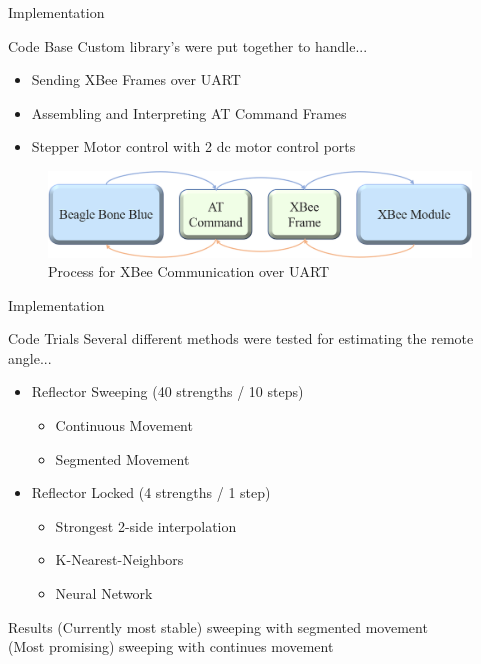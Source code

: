 \documentclass{beamer}
\begin{document}
\begin{frame}{Implementation}
\begin{block}{Code Base}
	Custom library's were put together to handle...
	\begin{itemize}
		\item Sending XBee Frames over UART
		\item Assembling and Interpreting AT Command Frames
		\item Stepper Motor control with 2 dc motor control ports
	\end{itemize}
\end{block}
\begin{figure}
	\centering
	\includegraphics[width=\textwidth]{figs/img/Command Process Diagram.png}				 		\caption{Process for XBee Communication over UART}
	\label{fig:CommandProcessDiagram}
\end{figure}
\end{frame}

\begin{frame}{Implementation}
\begin{block}{Code Trials}
Several different methods were tested for estimating the remote angle...
    \begin{itemize}
    	\item Reflector Sweeping (40 strengths / 10 steps)
    	\begin{itemize}
    		\item Continuous Movement
    		\item Segmented Movement
    	\end{itemize}
    	\item Reflector Locked (4 strengths / 1 step)
    	\begin{itemize}
    		\item Strongest 2-side interpolation
    		\item K-Nearest-Neighbors
    		\item Neural Network
    	\end{itemize}
    \end{itemize}
\end{block}
\begin{block}{Results}
	(Currently most stable) sweeping with segmented movement \\
	(Most promising) sweeping with continues movement
\end{block}
\end{frame}
\end{document}
